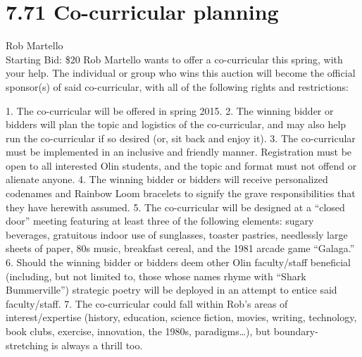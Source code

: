 \documentclass[11pt]{article}
\begin{document}
\section*{7.71 Co-curricular planning}
Rob Martello
\\
Starting Bid: \$20
\newline
Rob Martello wants to offer a co-curricular this spring, with your help.  The individual or group who wins this auction will become the official sponsor(s) of said co-curricular, with all of the following rights and restrictions:

1.        The co-curricular will be offered in spring 2015. 
2.        The winning bidder or bidders will plan the topic and logistics of the co-curricular, and may also help run the co-curricular if so desired (or, sit back and enjoy it).
3.        The co-curricular must be implemented in an inclusive and friendly manner.  Registration must be open to all interested Olin students, and the topic and format must not offend or alienate anyone. 
4.        The winning bidder or bidders will receive personalized codenames and Rainbow Loom bracelets to signify the grave responsibilities that they have herewith assumed.
5.        The co-curricular will be designed at a “closed door” meeting featuring at least three of the following elements: sugary beverages, gratuitous indoor use of sunglasses, toaster pastries, needlessly large sheets of paper, 80s music, breakfast cereal, and the 1981 arcade game “Galaga.” 
6.        Should the winning bidder or bidders deem other Olin faculty/staff beneficial (including, but not limited to, those whose names rhyme with “Shark Bummerville”) strategic poetry will be deployed in an attempt to entice said faculty/staff.
7.        The co-curricular could fall within Rob’s areas of interest/expertise (history, education, science fiction, movies, writing, technology, book clubs, exercise, innovation, the 1980s, paradigms…), but boundary-stretching is always a thrill too.
\\[6ex]
\end{document}
